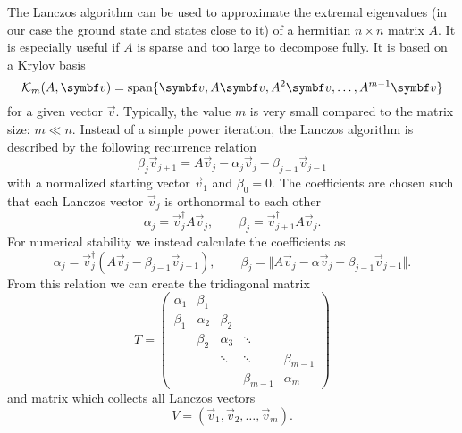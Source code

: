 The Lanczos algorithm \cite{Lanczos1950} can be used to approximate the extremal eigenvalues
(in our case the ground state and states close to it)
of a hermitian $n\times n$ matrix $A$.
It is especially useful if $A$ is sparse and too large to decompose fully.
It is based on a Krylov basis
\begin{equation}
    \mathcal{K}_m(A, \vec{v}) = \spn\{\vec{v}, A\vec{v}, A^2\vec{v}, \ldots, A^{m-1}\vec{v}\}
\end{equation}
for a given vector $\vec{v}$.
Typically, the value $m$ is very small compared to the matrix size: $m \ll n$.
Instead of a simple power iteration, the Lanczos algorithm is described by the
following recurrence relation
\begin{equation}
    \beta_j\vec{v}_{j+1} = A\vec{v}_j - \alpha_j\vec{v}_j - \beta_{j-1}\vec{v}_{j-1}
    \label{eq:Lanczos-recurrence}
\end{equation}
with a normalized starting vector $\vec{v}_1$ and $\beta_0 = 0$.
The coefficients are chosen such that each Lanczos vector $\vec{v}_j$ is orthonormal to each other
\begin{equation}
    \alpha_j = \vec{v}_j^\dag A \vec{v}_j,
    \qquad
    \beta_j = \vec{v}_{j+1}^\dag A\vec{v}_j.
\end{equation}
For numerical stability \cite{Paige1972, Paige1976}
we instead calculate the coefficients as
\begin{equation}
    \alpha_j = \vec{v}_j^\dag( A \vec{v}_j - \beta_{j-1}\vec{v}_{j-1}),
    \qquad
    \beta_j = \Vert A\vec{v}_j - \alpha\vec{v}_j -  \beta_{j-1}\vec{v}_{j-1} \Vert.
\end{equation}
From this relation we can create the tridiagonal matrix
\begin{equation}
    T
    =
    \begin{pmatrix}
        \alpha_1 & \beta_1  &          &             &             \\
        \beta_1  & \alpha_2 & \beta_2  &             &             \\
                 & \beta_2  & \alpha_3 & \ddots      &             \\
                 &          & \ddots   & \ddots      & \beta_{m-1} \\
                 &          &          & \beta_{m-1} & \alpha_m
    \end{pmatrix}
\end{equation}
and matrix which collects all Lanczos vectors
\begin{equation}
    V = (\vec{v}_1, \vec{v}_2, \ldots, \vec{v}_m).
\end{equation}
